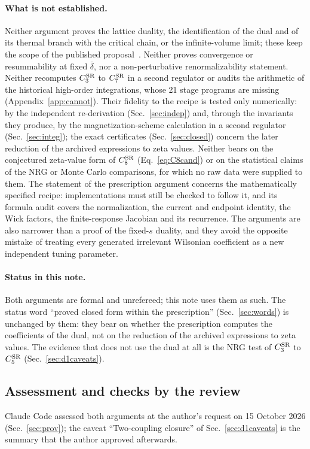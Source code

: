 \documentclass[11pt,a4paper]{article}
\numberwithin{equation}{section}
\newcommand{\CSR}{C^{\rm SR}}
\newcommand{\db}{\bar\delta}
\begin{document}
\paragraph{What is not established.} Neither argument proves the lattice duality, the identification of the dual and
of its thermal branch with the critical chain, or the infinite-volume limit; these keep the scope of the published
proposal~\cite{Benedetti:2024wgx,Benedetti:2025nzp}. Neither proves convergence or resummability at fixed $\db$, nor
a non-perturbative renormalizability statement. Neither recomputes $\CSR_3$ to $\CSR_7$ in a second regulator or
audits the arithmetic of the historical high-order integrations, whose 21 stage programs are missing
(Appendix~\ref{app:cannot}). Their fidelity to the recipe is tested only numerically: by the independent
re-derivation (Sec.~\ref{sec:indep}) and, through the invariants they produce, by the magnetization-scheme calculation
in a second regulator (Sec.~\ref{sec:integ}); the exact certificates (Sec.~\ref{sec:closed}) concern the later reduction of the archived
expressions to zeta values. Neither bears on the conjectured zeta-value form of
$\CSR_8$ (Eq.~\eqref{eq:C8cand}) or on the statistical claims of the NRG or Monte Carlo comparisons, for which no raw
data were supplied to them. The statement of the prescription argument
concerns the mathematically specified recipe: implementations must still be checked to follow it, and its formula audit
covers the normalization, the current and endpoint identity, the Wick factors, the finite-response Jacobian and its
recurrence. The arguments are also narrower than a proof of the fixed-$s$ duality, and they avoid the opposite mistake
of treating every generated irrelevant Wilsonian coefficient as a new independent tuning parameter.

\paragraph{Status in this note.} Both arguments are formal and unrefereed; this note uses them as such. The status
word ``proved closed form within the prescription'' (Sec.~\ref{sec:words}) is unchanged by them: they bear on whether
the prescription computes the coefficients of the dual, not on the reduction of the archived expressions to zeta
values. The evidence that does not use the dual at all is the NRG test of $\CSR_3$ to $\CSR_5$
(Sec.~\ref{sec:d1caveats}).

\subsection{Assessment and checks by the review}\label{app:clos:checks}
Claude Code assessed both arguments at the author's request on 15 October 2026 (Sec.~\ref{sec:prov}); the caveat
``Two-coupling closure'' of Sec.~\ref{sec:d1caveats} is the summary that the author approved afterwards.
\end{document}
